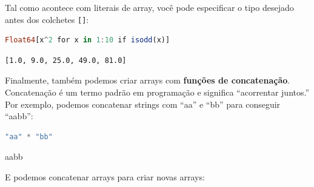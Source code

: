 \documentclass[
  notoc %
]{tufte-book}
\newcommand{\passthrough}[1]{#1}
\begin{document}
Tal como acontece com literais de array, você pode especificar o tipo
desejado antes dos colchetes \passthrough{\lstinline![]!}:

\begin{lstlisting}[language=Julia]
Float64[x^2 for x in 1:10 if isodd(x)]
\end{lstlisting}

\begin{lstlisting}[language=Output]
[1.0, 9.0, 25.0, 49.0, 81.0]
\end{lstlisting}

Finalmente, também podemos criar arrays com \textbf{funções de
concatenação}. Concatenação é um termo padrão em programação e significa
``acorrentar juntos.'' Por exemplo, podemos concatenar strings com
``aa'' e ``bb'' para conseguir ``aabb'':

\begin{lstlisting}[language=Julia]
"aa" * "bb"
\end{lstlisting}

aabb

E podemos concatenar arrays para criar novas arrays:
\end{document}
